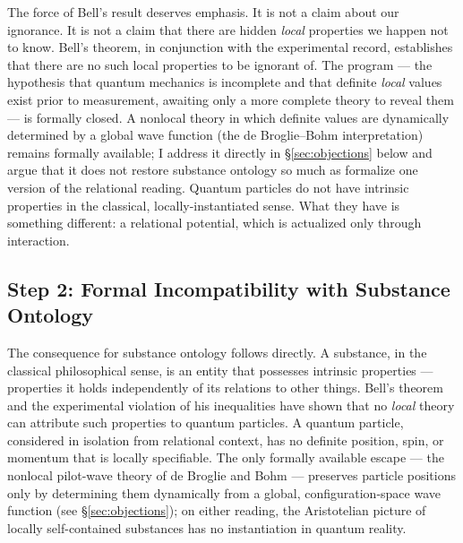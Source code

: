 The force of Bell's result deserves emphasis.
It is not a claim about our ignorance.
It is not a claim that there are hidden \emph{local} properties we happen
not to know.
Bell's theorem, in conjunction with the experimental record, establishes
that there are no such local properties to be ignorant of.
The \citet{Einstein1935EPR} program --- the hypothesis that quantum mechanics
is incomplete and that definite \emph{local} values exist prior to measurement,
awaiting only a more complete theory to reveal them --- is formally closed.
A nonlocal theory in which definite values are dynamically determined by a
global wave function (the de Broglie--Bohm interpretation) remains formally
available; I address it directly in \S\ref{sec:objections} below and argue
that it does not restore substance ontology so much as formalize one version
of the relational reading.
Quantum particles do not have intrinsic properties in the classical,
locally-instantiated sense.
What they have is something different: a relational potential, which is
actualized only through interaction.

\subsection{Step 2: Formal Incompatibility with Substance Ontology}

The consequence for substance ontology follows directly.
A substance, in the classical philosophical sense, is an entity that
possesses intrinsic properties --- properties it holds independently of
its relations to other things.
Bell's theorem and the experimental violation of his inequalities have shown
that no \emph{local} theory can attribute such properties to quantum particles.
A quantum particle, considered in isolation from relational context, has
no definite position, spin, or momentum that is locally specifiable.
The only formally available escape --- the nonlocal pilot-wave theory of
de Broglie and Bohm --- preserves particle positions only by determining
them dynamically from a global, configuration-space wave function (see
\S\ref{sec:objections}); on either reading, the Aristotelian picture of
locally self-contained substances has no instantiation in quantum reality.

